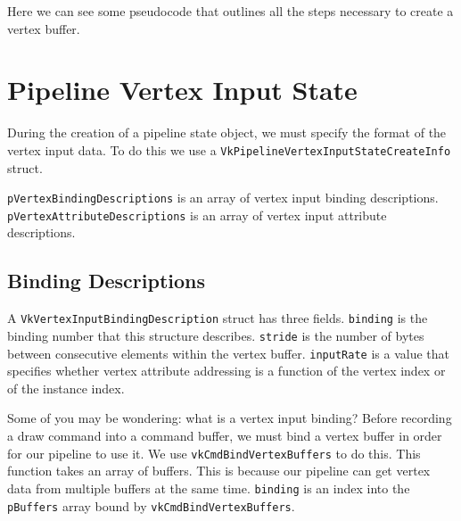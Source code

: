 Here we can see some pseudocode that outlines all the steps necessary to
create a vertex buffer.

\begin{minipage}{\linewidth}{\noindent}
    
\end{minipage}

\section{Pipeline Vertex Input State}

During the creation of a pipeline state object, we must specify
the format of the vertex input data.
To do this we use a \texttt{VkPipelineVertexInputStateCreateInfo} struct.

\begin{minipage}{\linewidth}{\noindent}
    
\end{minipage}

\texttt{pVertexBindingDescriptions} is an array of vertex input binding descriptions.
\texttt{pVertexAttributeDescriptions} is an array of vertex input attribute descriptions.

\subsection{Binding Descriptions}

A \texttt{VkVertexInputBindingDescription} struct has three fields.
\texttt{binding} is the binding number that this structure describes.
\texttt{stride} is the number of bytes between consecutive elements within the
vertex buffer.
\texttt{inputRate} is a value that specifies whether vertex attribute addressing
is a function of the vertex index or of the instance index.

Some of you may be wondering: what is a vertex input binding?
Before recording a draw command into a command buffer,
we must bind a vertex buffer in order for our pipeline to use it.
We use \texttt{vkCmdBindVertexBuffers} to do this.
This function takes an array of buffers.
This is because our pipeline can get vertex data from multiple buffers
at the same time.
\texttt{binding} is an index into the \texttt{pBuffers} array bound by
\texttt{vkCmdBindVertexBuffers}.

